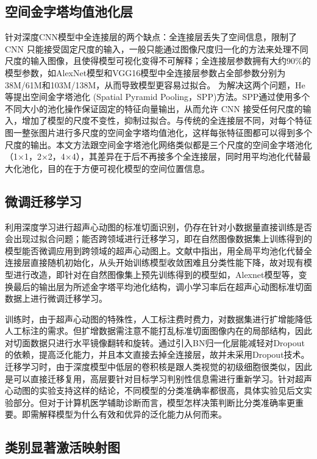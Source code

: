 \subsection{空间金字塔均值池化层}

针对深度CNN模型中全连接层的两个缺点：全连接层丢失了空间信息，限制了 CNN 只能接受固定尺度的输入，一般只能通过图像尺度归一化的方法来处理不同尺度的输入图像，且使得模型可视化变得不可解释；全连接层参数拥有大约90\%的模型参数，如AlexNet模型\citep{Krizhevsky2012}和VGG16模型\citep{Chatfield2014}中全连接层参数占全部参数分别为38M/61M和103M/138M，从而导致模型更容易过拟合\citep{Szegedy2015}。
为解决这两个问题，He等提出空间金字塔池化 (Spatial Pyramid Pooling，SPP)方法\citep{He2015spp}。SPP通过使用多个不同大小的池化操作保证固定的特征向量输出，从而允许 CNN 接受任何尺度的输入，增加了模型的尺度不变性，抑制过拟合。与传统的全连接层不同，对每个特征图一整张图片进行多尺度的空间金字塔均值池化，这样每张特征图都可以得到多个尺度的输出。本文方法跟空间金字塔池化网络类似都是三个尺度的空间金字塔池化（1×1，2×2，4×4），其差异在于后不再接多个全连接层，同时用平均池化代替最大化池化，目的在于方便可视化模型的空间位置信息。
\subsection{微调迁移学习}

利用深度学习进行超声心动图的标准切面识别，仍存在针对小数据量直接训练是否会出现过拟合问题；能否跨领域进行迁移学习，即在自然图像数据集上训练得到的模型能否微调应用到跨领域的超声心动图上。文献中指出，用全局平均池化代替全连接层直接随机初始化，从头开始训练模型收敛困难且分类性能下降，故对现有模型进行改造，即针对在自然图像集上预先训练得到的模型如，Alexnet模型等，变换最后的输出层为所述金字塔平均池化结构，调小学习率后在超声心动图标准切面数据上进行微调迁移学习。

训练时，由于超声心动图的特殊性，人工标注费时费力，对数据集进行扩增能降低人工标注的需求。但扩增数据需注意不能打乱标准切面图像内在的局部结构，因此对切面数据只进行水平镜像翻转和旋转。通过引入BN归一化层能减轻对Dropout的依赖，提高泛化能力，并且本文直接去掉全连接层，故并未采用Dropout技术。
迁移学习时，由于深度模型中低层的卷积核是跟人类视觉的初级细胞很类似，因此是可以直接迁移复用，高层要针对目标学习判别性信息需进行重新学习\citep{Zhou2015}。针对超声心动图的实验支持这样的结论，不同模型的分类准确率都很高，具体实验见后文实验部分。但对于计算机医学辅助诊断而言，模型怎样决策判断比分类准确率更重要。即需解释模型为什么有效和优异的泛化能力从何而来。
\subsection{类别显著激活映射图}

